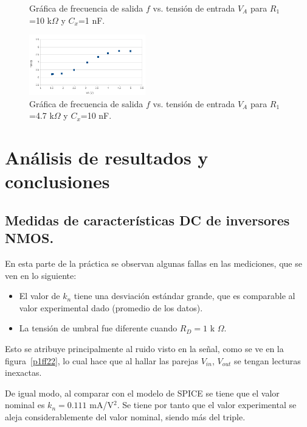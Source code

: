 \documentclass[twocolumn]{IEEEtran}
\begin{document}
\begin{figure}[H]%
\centering
	\caption{ Gráfica de frecuencia de salida $f$ vs. tensión de entrada $V_A$ para $R_1$=10 k$\Omega$ y $C_x$=1 nF.}
	
	\label{vco_1}

\end{figure}

\begin{figure}[H]%
\centering
	\includegraphics[width=0.45\textwidth]{./pics/vco_2.png}
	\caption{ Gráfica de frecuencia de salida $f$ vs. tensión de entrada $V_A$ para $R_1$=4.7 k$\Omega$ y $C_x$=10 nF.}
	
	\label{vco_2}

\end{figure}


\section{Análisis de resultados y conclusiones}
\subsection{Medidas de características DC de inversores NMOS.}
En esta parte de la práctica se observan algunas fallas en las mediciones, que se ven en lo siguiente: 

\begin{itemize}
	\item El valor de $k_n$ tiene una desviación estándar grande, que es comparable al valor experimental dado (promedio de los datos).  
	\item La tensión de umbral fue diferente cuando $R_D=1$ k $\Omega$. 
\end{itemize}

Esto se atribuye principalmente al ruido visto en la señal, como se ve en la figura~\ref{p1ff22}, lo cual hace que al hallar las parejas $V_{in}$, $V_{out}$ se tengan lecturas inexactas.

De igual modo, al comparar con el modelo de SPICE se tiene que el valor nominal es $k_n=0.111$ mA/V$^2$. Se tiene por tanto que el valor experimental se aleja considerablemente del valor nominal, siendo más del triple.
 
\end{document}
